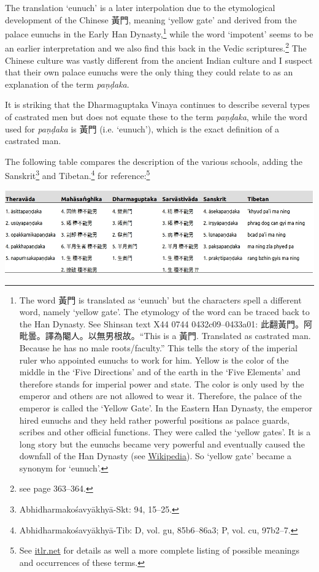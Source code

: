 The translation `eunuch' is a later interpolation due to the etymological development of the Chinese 黃門, meaning `yellow gate' and derived from the palace eunuchs in the Early Han Dynasty,\footnote{The word 黃門 is translated as `eunuch' but the characters spell a different word, namely `yellow gate'. The etymology of the word can be traced back to the Han Dynasty. See Shinsan text X44 0744 0432c09–0433a01: 此翻黃門。阿毗曇。譯為閹人。以無男根故。``This is a 黃門. Translated as castrated man. Because he has no male roots/faculty.'' This tells the story of the imperial ruler who appointed eunuchs to work for him. Yellow is the color of the middle in the `Five Directions' and of the earth in the `Five Elements' and therefore stands for imperial power and state. The color is only used by the emperor and others are not allowed to wear it. Therefore, the palace of the emperor is called the `Yellow Gate'. In the Eastern Han Dynasty, the emperor hired eunuchs and they held rather powerful positions as palace guards, scribes and other official functions. They were called the `yellow gates'. It is a long story but the eunuchs became very powerful and eventually caused the downfall of the Han Dynasty (see \href{https://en.wikipedia.org/wiki/Han_dynasty}{Wikipedia}). So `yellow gate' became a synonym for `eunuch'.} while the word `impotent' seems to be an earlier interpretation and we also find this back in the Vedic scriptures.\footnote{see \cite{zwilling} page 363–364.} The Chinese culture was vastly different from the ancient Indian culture and I suspect that their own palace eunuchs were the only thing they could relate to as an explanation of the term {\em paṇḍaka}.

It is striking that the Dharmaguptaka Vinaya continues to describe several types of castrated men but does not equate these to the term {\em paṇḍaka}, while the word used for {\em paṇḍaka} is 黃門 (i.e. `eunuch'), which is the exact definition of a castrated man.

The following table compares the description of the various schools, adding the Sanskrit\footnote{Abhidharmakośavyākhyā-Skt: 94, 15–25.} and Tibetan.\footnote{Abhidharmakośavyākhyā-Tib: D, vol. gu, 85b6–86a3; P, vol. cu, 97b2–7.} for reference:\footnote{See \href{http://www.itlr.net/hwid:281142}{itlr.net} for details as well a more complete listing of possible meanings and occurrences of these terms.}

\bigskip
\includegraphics[width=\linewidth]{pandaka.jpg}
\label{pandaka}
\medskip

